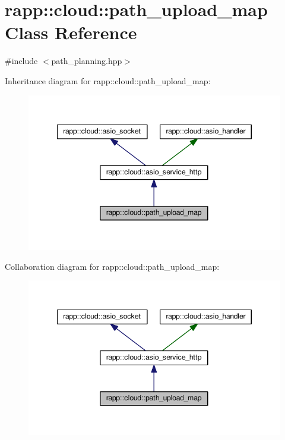 \hypertarget{classrapp_1_1cloud_1_1path__upload__map}{\section{rapp\-:\-:cloud\-:\-:path\-\_\-upload\-\_\-map Class Reference}
\label{classrapp_1_1cloud_1_1path__upload__map}
}


{\ttfamily \#include $<$path\-\_\-planning.\-hpp$>$}



Inheritance diagram for rapp\-:\-:cloud\-:\-:path\-\_\-upload\-\_\-map\-:
\nopagebreak
\begin{figure}[H]
\begin{center}
\leavevmode
\includegraphics[width=345pt]{classrapp_1_1cloud_1_1path__upload__map__inherit__graph}
\end{center}
\end{figure}


Collaboration diagram for rapp\-:\-:cloud\-:\-:path\-\_\-upload\-\_\-map\-:
\nopagebreak
\begin{figure}[H]
\begin{center}
\leavevmode
\includegraphics[width=345pt]{classrapp_1_1cloud_1_1path__upload__map__coll__graph}
\end{center}
\end{figure}
